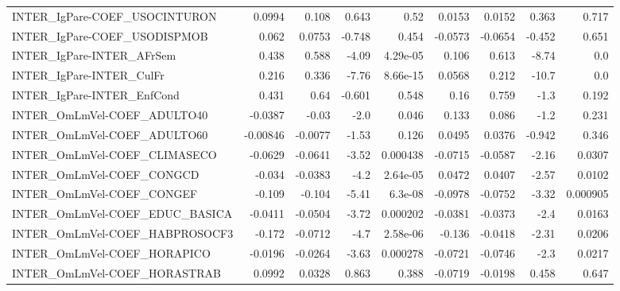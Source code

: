 \begin{tabular}{lrrrrrrrr}
INTER\_IgPare-COEF\_USOCINTURON         &      0.0994 &        0.108 &   0.643 &     0.52 &     0.0153 &      0.0152 &        0.363 &         0.717 \\
INTER\_IgPare-COEF\_USODISPMOB          &       0.062 &       0.0753 &  -0.748 &    0.454 &    -0.0573 &     -0.0654 &       -0.452 &         0.651 \\
INTER\_IgPare-INTER\_AFrSem             &       0.438 &        0.588 &   -4.09 & 4.29e-05 &      0.106 &       0.613 &        -8.74 &           0.0 \\
INTER\_IgPare-INTER\_CulFr              &       0.216 &        0.336 &   -7.76 & 8.66e-15 &     0.0568 &       0.212 &        -10.7 &           0.0 \\
INTER\_IgPare-INTER\_EnfCond            &       0.431 &         0.64 &  -0.601 &    0.548 &       0.16 &       0.759 &         -1.3 &         0.192 \\
INTER\_OmLmVel-COEF\_ADULTO40           &     -0.0387 &        -0.03 &    -2.0 &    0.046 &      0.133 &       0.086 &         -1.2 &         0.231 \\
INTER\_OmLmVel-COEF\_ADULTO60           &    -0.00846 &      -0.0077 &   -1.53 &    0.126 &     0.0495 &      0.0376 &       -0.942 &         0.346 \\
INTER\_OmLmVel-COEF\_CLIMASECO          &     -0.0629 &      -0.0641 &   -3.52 & 0.000438 &    -0.0715 &     -0.0587 &        -2.16 &        0.0307 \\
INTER\_OmLmVel-COEF\_CONGCD             &      -0.034 &      -0.0383 &    -4.2 & 2.64e-05 &     0.0472 &      0.0407 &        -2.57 &        0.0102 \\
INTER\_OmLmVel-COEF\_CONGEF             &      -0.109 &       -0.104 &   -5.41 &  6.3e-08 &    -0.0978 &     -0.0752 &        -3.32 &      0.000905 \\
INTER\_OmLmVel-COEF\_EDUC\_BASICA        &     -0.0411 &      -0.0504 &   -3.72 & 0.000202 &    -0.0381 &     -0.0373 &         -2.4 &        0.0163 \\
INTER\_OmLmVel-COEF\_HABPROSOCF3        &      -0.172 &      -0.0712 &    -4.7 & 2.58e-06 &     -0.136 &     -0.0418 &        -2.31 &        0.0206 \\
INTER\_OmLmVel-COEF\_HORAPICO           &     -0.0196 &      -0.0264 &   -3.63 & 0.000278 &    -0.0721 &     -0.0746 &         -2.3 &        0.0217 \\
INTER\_OmLmVel-COEF\_HORASTRAB          &      0.0992 &       0.0328 &   0.863 &    0.388 &    -0.0719 &     -0.0198 &        0.458 &         0.647 \\

\end{tabular}
